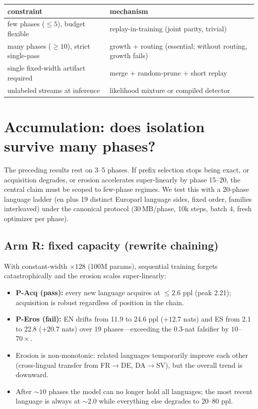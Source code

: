 \documentclass[11pt]{article}
\theoremstyle{definition}\newtheorem{definition}{Definition}
\theoremstyle{remark}\newtheorem{remark}{Remark}
\begin{document}
\begin{table}[h]
\centering
\begin{tabular}{ll}
\toprule
constraint & mechanism \\
\midrule
few phases (${\le}5$), budget flexible & replay-in-training (joint parity, trivial) \\
many phases (${\ge}10$), strict single-pass & growth + routing (essential; without routing, growth fails) \\
single fixed-width artifact required & merge + random-prune + short replay \\
unlabeled streams at inference & likelihood mixture or compiled detector \\
\bottomrule
\end{tabular}
\end{table}

\section{Accumulation: does isolation survive many phases?}
\label{sec:accum}

The preceding results rest on 3--5 phases. If prefix selection stops being exact, or
acquisition degrades, or erosion accelerates super-linearly by phase 15--20, the central
claim must be scoped to few-phase regimes. We test this with a 20-phase language ladder
(en plus 19 distinct Europarl language sides, fixed order, families interleaved) under the
canonical protocol (30\,MB/phase, 10k steps, batch 4, fresh optimizer per phase).

\subsection{Arm R: fixed capacity (rewrite chaining)}

With constant-width $\times128$ (100M params), sequential training forgets catastrophically
and the erosion scales super-linearly:
\begin{itemize}\itemsep2pt
\item \textbf{P-Acq (pass):} every new language acquires at $\le2.6$ ppl (peak 2.21);
acquisition is robust regardless of position in the chain.
\item \textbf{P-Eros (fail):} EN drifts from 11.9 to 24.6 ppl ($+12.7$ nats) and ES from
2.1 to 22.8 ($+20.7$ nats) over 19 phases---exceeding the 0.3-nat falsifier by
$10$--$70\times$.
\item Erosion is non-monotonic: related languages temporarily improve each other (cross-lingual
transfer from FR$\to$DE, DA$\to$SV), but the overall trend is downward.
\item After ${\sim}10$ phases the model can no longer hold all languages; the most recent
language is always at ${\sim}2.0$ while everything else degrades to 20--80 ppl.
\end{itemize}
\end{document}
